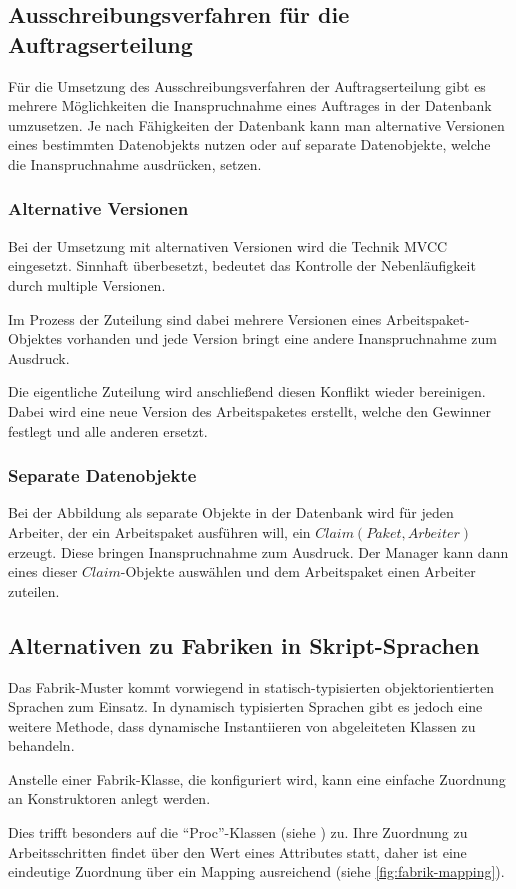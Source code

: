 \subsection{Ausschreibungsverfahren für die Auftragserteilung}
\label{sec:verfahren:erteilung}

Für die Umsetzung des Ausschreibungsverfahren der Auftragserteilung gibt es
mehrere Möglichkeiten die Inanspruchnahme eines Auftrages in
der Datenbank umzusetzen. Je nach Fähigkeiten der Datenbank kann man 
alternative Versionen eines bestimmten Datenobjekts nutzen
oder auf separate Datenobjekte, welche die Inanspruchnahme ausdrücken, setzen.

\subsubsection{Alternative Versionen}

Bei der Umsetzung mit alternativen Versionen wird die Technik \ac{MVCC} eingesetzt.
Sinnhaft überbesetzt, bedeutet das Kontrolle der Nebenläufigkeit durch multiple Versionen.

Im Prozess der Zuteilung sind dabei mehrere Versionen eines Arbeitspaket-Objektes vorhanden und jede Version bringt eine andere Inanspruchnahme zum Ausdruck.

Die eigentliche Zuteilung wird anschließend diesen Konflikt wieder bereinigen.
Dabei wird eine neue Version des Arbeitspaketes erstellt, welche den Gewinner festlegt und alle anderen ersetzt.

\subsubsection{Separate Datenobjekte}

Bei der Abbildung als separate Objekte in der Datenbank
wird für jeden Arbeiter, der ein Arbeitspaket ausführen will, ein $Claim (Paket, Arbeiter)$ erzeugt. Diese bringen Inanspruchnahme zum Ausdruck.
Der Manager kann dann eines dieser $Claim$-Objekte auswählen und dem Arbeitspaket einen Arbeiter zuteilen.

\subsection{Alternativen zu Fabriken in Skript-Sprachen}

Das Fabrik-Muster kommt vorwiegend in statisch-typisierten objektorientierten Sprachen zum Einsatz. In dynamisch typisierten Sprachen gibt es jedoch eine weitere Methode, dass dynamische Instantiieren von abgeleiteten Klassen zu behandeln.

Anstelle einer Fabrik-Klasse, die konfiguriert wird,
kann eine einfache Zuordnung an Konstruktoren anlegt werden.

Dies trifft besonders auf die ``Proc''-Klassen (siehe ) zu.
Ihre Zuordnung zu Arbeitsschritten findet über den Wert eines Attributes statt,
daher ist eine eindeutige Zuordnung über ein Mapping ausreichend (siehe \cref{fig:fabrik-mapping}).

